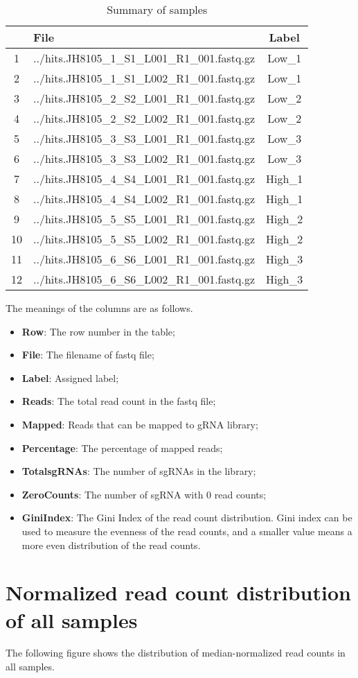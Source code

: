 \documentclass{article}
\begin{document}
\begin{table}[ht]
\centering
\begin{tabular}{cp{9cm}c}
  \hline
 & File & Label \\ 
  \hline
1 & ../hits.JH8105\_1\_S1\_L001\_R1\_001.fastq.gz & Low\_1 \\ 
  2 & ../hits.JH8105\_1\_S1\_L002\_R1\_001.fastq.gz & Low\_1 \\ 
  3 & ../hits.JH8105\_2\_S2\_L001\_R1\_001.fastq.gz & Low\_2 \\ 
  4 & ../hits.JH8105\_2\_S2\_L002\_R1\_001.fastq.gz & Low\_2 \\ 
  5 & ../hits.JH8105\_3\_S3\_L001\_R1\_001.fastq.gz & Low\_3 \\ 
  6 & ../hits.JH8105\_3\_S3\_L002\_R1\_001.fastq.gz & Low\_3 \\ 
  7 & ../hits.JH8105\_4\_S4\_L001\_R1\_001.fastq.gz & High\_1 \\ 
  8 & ../hits.JH8105\_4\_S4\_L002\_R1\_001.fastq.gz & High\_1 \\ 
  9 & ../hits.JH8105\_5\_S5\_L001\_R1\_001.fastq.gz & High\_2 \\ 
  10 & ../hits.JH8105\_5\_S5\_L002\_R1\_001.fastq.gz & High\_2 \\ 
  11 & ../hits.JH8105\_6\_S6\_L001\_R1\_001.fastq.gz & High\_3 \\ 
  12 & ../hits.JH8105\_6\_S6\_L002\_R1\_001.fastq.gz & High\_3 \\ 
   \hline
\end{tabular}
\caption{Summary of samples} 
\label{tab:three}
\end{table}



The meanings of the columns are as follows.

\begin{itemize}
\item \textbf{Row}: The row number in the table;
\item \textbf{File}: The filename of fastq file;
\item \textbf{Label}: Assigned label;
\item \textbf{Reads}: The total read count in the fastq file;
\item \textbf{Mapped}: Reads that can be mapped to gRNA library;
\item \textbf{Percentage}: The percentage of mapped reads;
\item \textbf{TotalsgRNAs}: The number of sgRNAs in the library; 
\item \textbf{ZeroCounts}: The number of sgRNA with 0 read counts;
\item \textbf{GiniIndex}: The Gini Index of the read count distribution. Gini index can be used to measure the evenness of the read counts, and a smaller value means a more even distribution of the read counts.
\end{itemize}



\newpage\section{Normalized read count distribution of all samples}
The following figure shows the distribution of median-normalized read counts in all samples.
\end{document}
